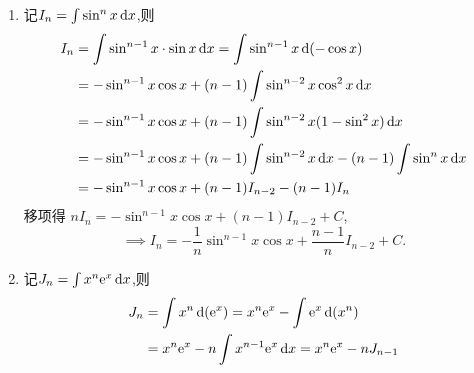 \begin{solution}
    \begin{enumerate}
        \item 记$I_n = \int \sin^n x \operatorname{d\!} x$,则
              \begin{align*}
                  I_n & = \int \sin^{n-1} x \cdot \sin x \operatorname{d\!} x = \int \sin^{n-1} x \operatorname{d}(-\cos x)           \\
                      & = -\sin^{n-1} x \cos x + (n-1) \int \sin^{n-2} x \cos^2 x \operatorname{d\!} x                     \\
                      & = -\sin^{n-1} x \cos x + (n-1) \int \sin^{n-2} x (1 - \sin^2 x) \operatorname{d\!} x               \\
                      & = -\sin^{n-1} x \cos x + (n-1) \int \sin^{n-2} x \operatorname{d\!} x - (n-1) \int \sin^n x \operatorname{d\!} x \\
                      & = -\sin^{n-1} x \cos x + (n-1) I_{n-2} - (n-1) I_n
              \end{align*}
              移项得 $n I_n = -\sin^{n-1} x \cos x + (n-1) I_{n-2} + C$,
              $$\implies I_n = -\frac{1}{n} \sin^{n-1} x \cos x + \frac{n-1}{n} I_{n-2} + C.$$
        \item 记$J_n = \int x^n \mathrm{e}^x \operatorname{d\!} x$,则
              \begin{align*}
                  J_n & = \int x^n \operatorname{d}(\mathrm{e}^x) = x^n \mathrm{e}^x - \int \mathrm{e}^x \operatorname{d}(x^n)       \\
                      & = x^n \mathrm{e}^x - n \int x^{n-1} \mathrm{e}^x \operatorname{d\!} x = x^n \mathrm{e}^x - n J_{n-1}
              \end{align*}
    \end{enumerate}
\end{solution}

